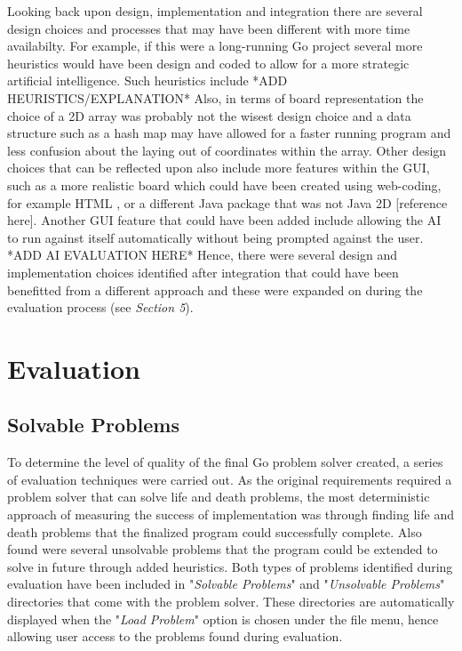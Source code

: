 \documentclass{l3proj}
\begin{document}
Looking back upon design, implementation and integration there are several design choices and processes that may have been different with more time availabilty. For example, if this were a long-running Go project several more heuristics would have been design and coded to allow for a more strategic artificial intelligence. Such heuristics include *ADD HEURISTICS/EXPLANATION* Also, in terms of board representation the choice of a 2D array was probably not the wisest design choice and a data structure such as a hash map may have allowed for a faster running program and less confusion about the laying out of coordinates within the array. Other design choices that can be reflected upon also include more features within the GUI, such as a more realistic board which could have been created using web-coding, for example HTML \cite{HTMLRef}, or a different Java package that was not Java 2D [reference here]. Another GUI feature that could have been added include allowing the AI to run against itself automatically without being prompted against the user. *ADD AI EVALUATION HERE* Hence, there were several design and implementation choices identified after integration that could have been benefitted from a different approach and these were expanded on during the evaluation process (see \textit{Section 5}).

\chapter{Evaluation}
\label{evaluation}

\section{Solvable Problems}

To determine the level of quality of the final Go problem solver created, a series of evaluation techniques were carried out. As the original requirements required a problem solver that can solve life and death problems, the most deterministic approach of measuring the success of implementation was through finding life and death problems that the finalized program could successfully complete. Also found were several unsolvable problems that the program could be extended to solve in future through added heuristics. Both types of problems identified during evaluation have been included in "\textit{Solvable Problems}" and "\textit{Unsolvable Problems}" directories that come with the problem solver. These directories are automatically displayed when the "\textit{Load Problem}" option is chosen under the file menu, hence allowing user access to the problems found during evaluation.
\end{document}
